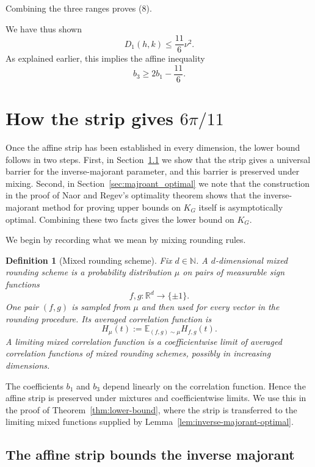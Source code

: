 \documentclass[11pt]{article}
\newtheorem{definition}[theorem]{Definition}
\newcommand{\R}{\mathbb R}
\newcommand{\E}{\mathbb E}
\begin{document}
Combining the three ranges proves (8).

We have thus shown
\[
        D_1(h,k)\le \frac{11}{6}\nu^2.
\]
As explained earlier, this implies the affine inequality
\[
        b_3 \ge 2b_1 -\frac{11}{6}.
\]

\section{How the strip gives $6\pi/11$}
\label{sec:strip_to_KG}

Once the affine strip has been established in every dimension, the lower bound follows in two steps.  First, in Section~\ref{sec:strip_majorant} we show that the strip gives a universal barrier for the inverse-majorant parameter, and this barrier is preserved under mixing. Second, in Section~\ref{sec:majroant_optimal} we note that the construction in the proof of Naor and Regev's optimality theorem shows that the inverse-majorant method for proving upper bounds on $K_G$ itself is asymptotically optimal.  Combining these two facts gives the lower bound on $K_G$.

We begin by recording what we mean by mixing rounding rules.

\begin{definition}[Mixed rounding scheme]\label{def:mixed-rounding}
Fix $d\in\mathbb N$.  A $d$-dimensional \emph{mixed rounding scheme} is a probability distribution $\mu$ on pairs of measurable sign functions
\[
        f,g:\R^d\to\{\pm1\}.
\]
One pair $(f,g)$ is sampled from $\mu$ and then used for every vector in the rounding procedure.  Its averaged correlation function is
\[
        H_\mu(t):=\E_{(f,g)\sim\mu}H_{f,g}(t).
\]
A \emph{limiting mixed correlation function} is a coefficientwise limit of averaged correlation functions of mixed rounding schemes, possibly in increasing dimensions.
\end{definition}

The coefficients $b_1$ and $b_3$ depend linearly on the correlation function.  Hence the affine strip is preserved under mixtures and coefficientwise limits.  We use this in the proof of Theorem~\ref{thm:lower-bound}, where the strip is transferred to the limiting mixed functions supplied by Lemma~\ref{lem:inverse-majorant-optimal}.

\subsection{The affine strip bounds the inverse majorant}
\label{sec:strip_majorant}
\end{document}
